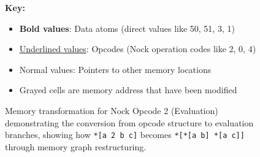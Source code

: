 \begin{figure}[htbp]
\vspace{0.3cm}

\begin{minipage}{\textwidth}
\small
\textbf{Key:}
\begin{itemize}
\item \textbf{Bold values}: Data atoms (direct values like 50, 51, 3, 1)
\item \underline{Underlined values}: Opcodes (Nock operation codes like 2, 0, 4)
\item Normal values: Pointers to other memory locations
\item Grayed cells are memory address that have been modified
\end{itemize}
\end{minipage}

\caption{Memory transformation for Nock Opcode 2 (Evaluation) demonstrating the conversion from opcode structure to evaluation branches, showing how \texttt{*[a 2 b c]} becomes \texttt{*[*[a b] *[a c]]} through memory graph restructuring.}
\label{fig:memory-transformation}
\end{figure}
